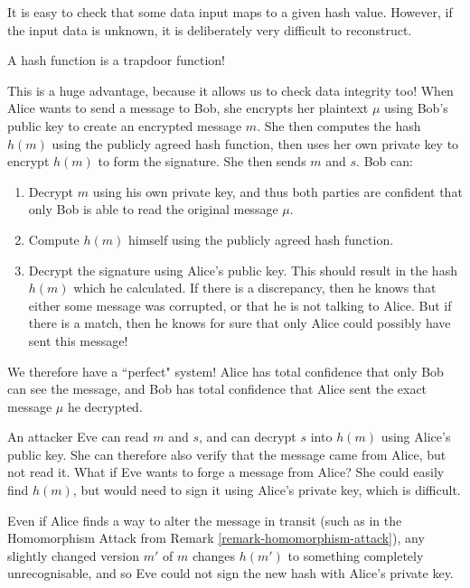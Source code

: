 \documentclass{article}
\begin{document}
\begin{corollary}
    It is easy to check that some data input maps to a given hash value. However, if the input data is unknown, it is deliberately very difficult to reconstruct.
\end{corollary}

\begin{corollary}
    A hash function is a trapdoor function!
\end{corollary}

This is a huge advantage, because it allows us to check data integrity too! When Alice wants to send a message to Bob, she encrypts her plaintext $\mu$ using Bob's public key to create an encrypted message $m$. She then computes the hash $h(m)$ using the publicly agreed hash function, then uses her own private key to encrypt $h(m)$ to form the signature. She then sends $m$ and $s$. Bob can:
\begin{enumerate}
    \item Decrypt $m$ using his own private key, and thus both parties are confident that only Bob is able to read the original message $\mu$.
    \item Compute $h(m)$ himself using the publicly agreed hash function.
    \item Decrypt the signature using Alice's public key. This should result in the hash $h(m)$ which he calculated. If there is a discrepancy, then he knows that either some message was corrupted, or that he is not talking to Alice. But if there is a match, then he knows for sure that only Alice could possibly have sent this message!
\end{enumerate}

We therefore have a ``perfect" system! Alice has total confidence that only Bob can see the message, and Bob has total confidence that Alice sent the exact message $\mu$ he decrypted.

An attacker Eve can read $m$ and $s$, and can decrypt $s$ into $h(m)$ using Alice's public key. She can therefore also verify that the message came from Alice, but not read it. What if Eve wants to forge a message from Alice? She could easily find $h(m)$, but would need to sign it using Alice's private key, which is difficult.

Even if Alice finds a way to alter the message in transit (such as in the Homomorphism Attack from Remark \ref{remark-homomorphism-attack}), any slightly changed version $m'$ of $m$ changes $h(m')$ to something completely unrecognisable, and so Eve could not sign the new hash with Alice's private key.
\end{document}
